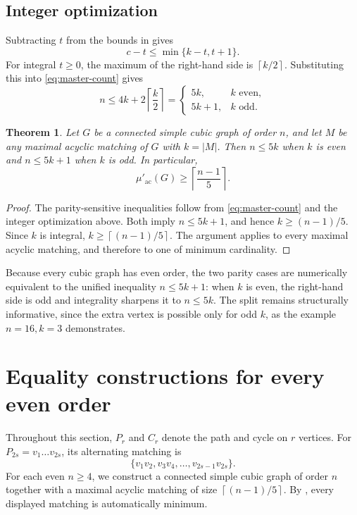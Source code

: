 \documentclass[smallextended,natbib,nospthms]{svjour3}
\newtheorem{theorem}{Theorem}[section]
\theoremstyle{definition}
\theoremstyle{remark}
\newcommand{\acnum}{\mu'_{\mathrm{ac}}}
\newcommand{\ceil}[1]{\left\lceil #1\right\rceil}
\begin{document}
\subsection{Integer optimization}

Subtracting $t$ from the bounds in  gives
\[
  c-t\leq\min\{k-t,t+1\}.
\]
For integral $t\geq 0$, the maximum of the right-hand side is
$\ceil{k/2}$. Substituting this into \eqref{eq:master-count} gives
\[
  n\leq 4k+2\ceil{\frac{k}{2}}
  =
  \begin{cases}
    5k,   & k\text{ even},\\
    5k+1, & k\text{ odd}.
  \end{cases}
\]

\begin{theorem}
\label{thm:sharp-lower}
Let $G$ be a connected simple cubic graph of order $n$, and let $M$ be any
maximal acyclic matching of $G$ with $k=|M|$. Then $n\leq 5k$ when $k$ is
even and $n\leq 5k+1$ when $k$ is odd. In particular,
\[
  \acnum(G)\geq\ceil{\frac{n-1}{5}}.
\]
\end{theorem}

\begin{proof}
The parity-sensitive inequalities follow from \eqref{eq:master-count} and the
integer optimization above. Both imply $n\leq 5k+1$, and hence
$k\geq(n-1)/5$. Since $k$ is integral,
$k\geq\ceil{(n-1)/5}$. The argument applies to every maximal acyclic
matching, and therefore to one of minimum cardinality.
\end{proof}

Because every cubic graph has even order, the two parity cases are numerically
equivalent to the unified inequality $n\leq 5k+1$: when $k$ is even, the
right-hand side is odd and integrality sharpens it to $n\leq 5k$. The split
remains structurally informative, since the extra vertex is possible only for
odd $k$, as the example $n=16,k=3$ demonstrates.

\section{Equality constructions for every even order}
\label{sec:constructions}

Throughout this section, $P_r$ and $C_r$ denote the path and cycle on $r$
vertices. For $P_{2s}=v_1\ldots v_{2s}$, its alternating matching is
\[
  \{v_1v_2,v_3v_4,\ldots,v_{2s-1}v_{2s}\}.
\]
For each even $n\geq 4$, we construct a connected simple cubic graph of order
$n$ together with a maximal acyclic matching of size
$\ceil{(n-1)/5}$. By , every displayed matching is
automatically minimum.
\end{document}

